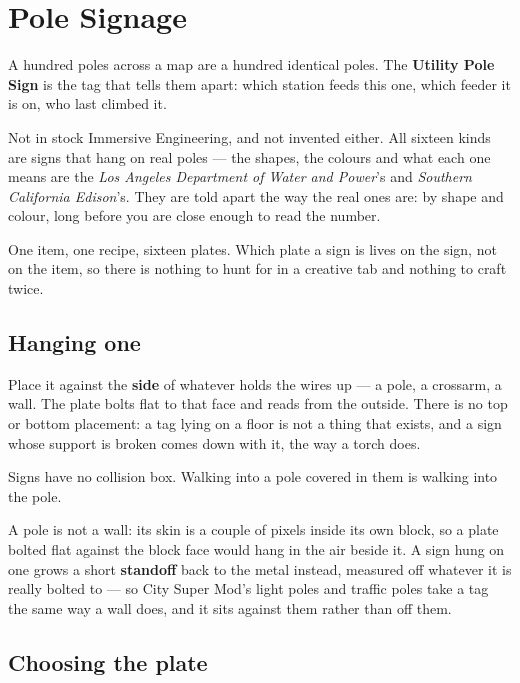 \chapter{Pole Signage}
\label{ch:signage}

A hundred poles across a map are a hundred identical poles. The \textbf{Utility Pole Sign} is the
tag that tells them apart: which station feeds this one, which feeder it is on, who last climbed it.

\begin{iefork}
Not in stock Immersive Engineering, and not invented either. All sixteen kinds are signs that hang
on real poles --- the shapes, the colours and what each one means are the \emph{Los Angeles
Department of Water and Power}'s and \emph{Southern California Edison}'s. They are told apart the
way the real ones are: by shape and colour, long before you are close enough to read the number.
\end{iefork}

One item, one recipe, sixteen plates. Which plate a sign is lives on the sign, not on the item, so
there is nothing to hunt for in a creative tab and nothing to craft twice.

\section{Hanging one}

Place it against the \textbf{side} of whatever holds the wires up --- a pole, a crossarm, a wall.
The plate bolts flat to that face and reads from the outside. There is no top or bottom placement: a
tag lying on a floor is not a thing that exists, and a sign whose support is broken comes down with
it, the way a torch does.

Signs have no collision box. Walking into a pole covered in them is walking into the pole.

\begin{ietip}
A pole is not a wall: its skin is a couple of pixels inside its own block, so a plate bolted flat
against the block face would hang in the air beside it. A sign hung on one grows a short
\textbf{standoff} back to the metal instead, measured off whatever it is really bolted to --- so
City Super Mod's light poles and traffic poles take a tag the same way a wall does, and it sits
against them rather than off them.
\end{ietip}

\section{Choosing the plate}

